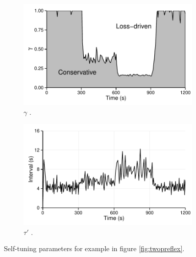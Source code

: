 \begin{figure}
    \centering
    \begin{subfigure}[b]{.5\linewidth}
        \centering
        \includegraphics[width=0.9\linewidth]{figures/cate/gamma}
        \caption{$\gamma$ \label{fig:gamma}.}
    \end{subfigure}%
    \begin{subfigure}[b]{.5\linewidth}
        \centering
        \includegraphics[width=0.9\linewidth]{figures/cate/tau}
        \caption{$\tau'$ \label{fig:tau}.}
    \end{subfigure}
    \caption[Parameters $\gamma$ and $\tau'$]{Self-tuning parameters for example in figure \ref{fig:twopreflex}.}
    \label{fig:tune}
\end{figure}

